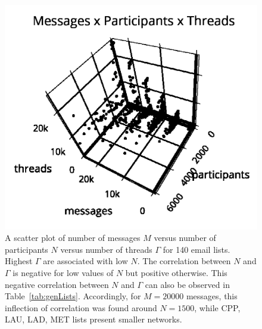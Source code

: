 \documentclass[%
aip,
jmp,%
amsmath,amssymb,
reprint,%
]{revtex4-1}
\begin{document}
\begin{figure}
\centering
\includegraphics[trim={0 0 0 1cm},clip,width=.7\columnwidth]{figs/mpgamma2}
\caption{A scatter plot of number of messages $M$ versus number of participants $N$ versus number of threads $\Gamma$ for 140 email lists.
Highest $\Gamma$ are associated with low $N$.
The correlation between $N$ and $\Gamma$ is negative for low values of $N$ but positive otherwise.
This negative correlation between $N$ and $\Gamma$ can also be observed in Table~\ref{tab:genLists}.
Accordingly, for $M=20000$ messages, this inflection
of correlation was found around $N=1500$, while CPP, LAU, LAD, MET lists 
present smaller networks.}
\label{fig:nmgamma3d}
\end{figure}



\end{document}
